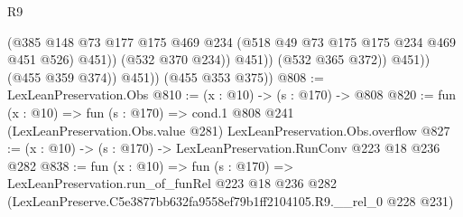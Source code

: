 \begin{lexlean}{R9}
\begin{coremodule}
                          (@385
                            @148
                            @73
                            @177
                            @175
                            @469
                            @234
                            (@518 @49 @73 @175 @175 @234 @469 @451 @526)
                            @451))
                        (@532 @370 @234))
                      @451))
                  (@532 @365 @372))
                @451))
            (@455 @359 @374))
          @451))
      (@455 @353 @375))
@808 := LexLeanPreservation.Obs
@810 := (x : @10) -> (s : @170) -> @808
@820 := fun (x : @10) =>
  fun (s : @170) =>
  cond.{1} @808 @241 (LexLeanPreservation.Obs.value @281) LexLeanPreservation.Obs.overflow
@827 := (x : @10) -> (s : @170) -> LexLeanPreservation.RunConv @223 @18 @236 @282
@838 := fun (x : @10) =>
  fun (s : @170) =>
  LexLeanPreservation.run_of_funRel
    @223
    @18
    @236
    @282
    (LexLeanPreserve.C5e3877bb632fa9558ef79b1ff2104105.R9.__rel_0 @228 @231)
\end{coremodule}
\end{lexlean}
